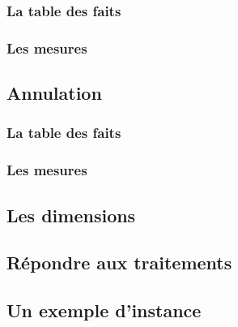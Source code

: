 \documentclass[11pt]{article}
\begin{document}
\subsubsection*{La table des faits}
\subsubsection*{Les mesures}
\subsection{Annulation}
\subsubsection*{La table des faits}
\subsubsection*{Les mesures}
\subsection{Les dimensions}

\subsection{Répondre aux traitements}

\subsection{Un exemple d'instance}
\end{document}
